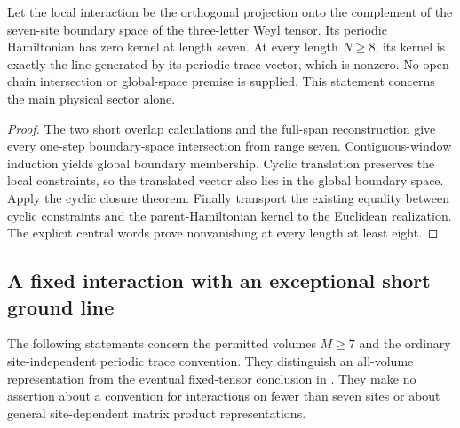 \begin{lemma}
    \label{lem:short_volume_weyl_periodic_kernel}
    \leanok
    Let the local interaction be the orthogonal projection onto
    the complement of the seven-site boundary space of the three-letter
    Weyl tensor. Its periodic Hamiltonian has zero kernel at
    length seven. At every length $N\ge8$, its kernel is exactly the
    line generated by its periodic trace vector, which is nonzero.
    No open-chain intersection or global-space premise is supplied.
    This statement concerns the main physical sector alone.
\end{lemma}
\begin{proof}\leanok
    The two short overlap calculations and the full-span reconstruction
    give every one-step boundary-space intersection from range seven.
    Contiguous-window induction yields global boundary membership.
    Cyclic translation preserves the local constraints, so the
    translated vector also lies in the global boundary space. Apply
    the cyclic closure theorem. Finally transport the existing
    equality between cyclic constraints and the parent-Hamiltonian kernel
    to the Euclidean realization. The explicit central words prove
    nonvanishing at every length at least eight.
\end{proof}

\subsection{A fixed interaction with an exceptional short ground line}

The following statements concern the permitted volumes $M\ge7$ and the
ordinary site-independent periodic trace convention. They distinguish an
all-volume representation from the eventual fixed-tensor conclusion in
\cite[Theorem~5]{Sanz2010Quantum}. They make no assertion about a convention
for interactions on fewer than seven sites or about general site-dependent
matrix product representations.

